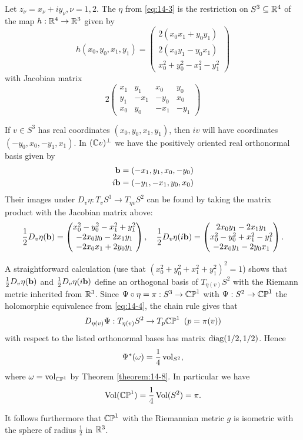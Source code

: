 \begin{example}\label{example:14-10}
Let $z_\nu=x_\nu+iy_\nu,\nu=1, 2$. The  $\eta$ from \eqref{eq:14-3} is the 
restriction on $S^3\subseteq {\ensuremath{\mathbb{R}}}^4$ of the map $h:{\mathbb{R}}^4\to{\ensuremath{\mathbb{R}}}^3$ given by 
\[
  h(x_0, y_0, x_1, y_1) = 
  \begin{pmatrix}
    2(x_0x_1+y_0y_1)\\
    2(x_0y_1-y_0x_1)\\
    x_0^2+y_0^2-x_1^2-y_1^2
  \end{pmatrix}
\]
with Jacobian matrix 
\[
  2\begin{pmatrix}
    x_1 & y_1 & x_0 & y_0\\
    y_1 & -x_1 & -y_0 & x_0\\
    x_0 & y_0 & -x_1 & -y_1 
  \end{pmatrix}
\]

If $v\in S^3$ has real coordinates $(x_0, y_0, x_1, y_1)$, then $iv$ will have coordinates
$(-y_0, x_0, -y_1, x_1)$. In $({\mathbb{C}} v)^\perp$ we have the positively oriented real orthonormal
basis given by
\begin{align*}
  \mathbf{b} & = (-x_1, y_1, x_0, -y_0) \\
  i\mathbf{b} & = (-y_1, -x_1, y_0, x_0)
\end{align*}
Their images under $D_v\eta:T_vS^3\to T_{\eta{v}}S^2$ can be found by taking the matrix product 
with the Jacobian matrix above:
\[
  \frac12D_v\eta(\mathbf{b}) = 
  \begin{pmatrix}
    x_0^2-y_0^2-x_1^2+y_1^2\\
    -2x_0y_0-2x_1y_1\\
    -2x_0x_1+2y_0y_1
  \end{pmatrix},\quad 
  \frac12D_v\eta(i\mathbf{b}) =
  \begin{pmatrix}
    2x_0y_1-2x_1y_1\\
    x_0^2-y_0^2+x_1^2-y_1^2\\
    -2x_0y_1-2y_0x_1
  \end{pmatrix}.
\]

A straightforward calculation  (use that $(x_0^2+y_0^2+x_1^2+y_1^2)^2=1$) shows that 
$\frac12 D_v\eta(\mathbf{b})$ and $\frac12 D_v\eta(i\mathbf{b})$ define an orthogonal basis of $T_{\eta(v)}S^2$
with the Riemann metric inherited from ${\mathbb{R}}^3$. Since $\Psi\circ\eta=\pi:S^3\to\mathbb{CP}^1$ with 
$\Psi:S^2\to\mathbb{CP}^1$ the holomorphic equivalence from \eqref{eq:14-4}, the chain rule gives that 
\[
  D_{\eta(v)}\Psi:T_{\eta(v)}S^2\to T_{p}\mathbb{CP}^1\enspace (p=\pi(v))
\]
with respect to the listed orthonormal bases has matrix $\operatorname{diag}(1/2,1/2)$. Hence
\[
  \Psi^*(\omega) = \frac14\,\mathrm{vol}_{S^2},
\]
where $\omega=\mathrm{vol}_{\mathbb{CP}^1}$ by Theorem \ref{theorem:14-8}. In particular we have 
\[
  \mathrm{Vol}(\mathbb{CP}^1) = \frac14\,\mathrm{Vol}(S^2) = \pi.
\]

It follows furthermore that $\mathbb{CP}^1$ with the Riemannian metric $g$ is isometric with
the sphere of radius $\frac12$ in ${\mathbb{R}}^3$.
\end{example}